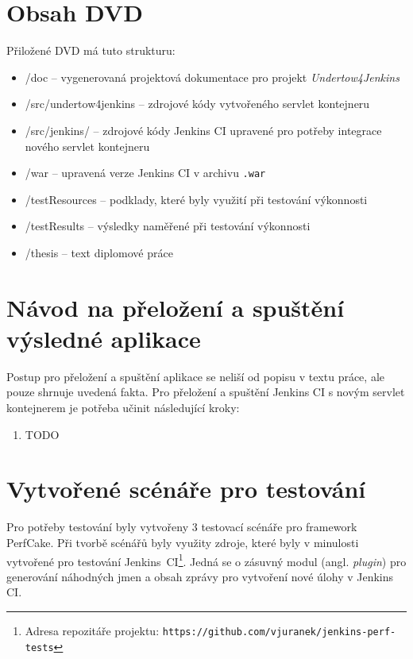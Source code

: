 
\chapter{Obsah DVD}
    Přiložené DVD má tuto strukturu:
    \begin{itemize}
        \item /doc -- vygenerovaná projektová dokumentace pro projekt \emph{Undertow4Jenkins}
        \item /src/undertow4jenkins -- zdrojové kódy vytvořeného servlet kontejneru
        \item /src/jenkins/ -- zdrojové kódy Jenkins CI upravené pro potřeby integrace nového servlet kontejneru
        \item /war -- upravená verze Jenkins CI v archivu \texttt{.war} 
        \item /testResources -- podklady, které byly využití při testování výkonnosti
        \item /testResults -- výsledky naměřené při testování výkonnosti
        \item /thesis -- text diplomové práce
    \end{itemize}


\chapter{Návod na přeložení a spuštění výsledné aplikace}
    Postup pro přeložení a spuštění aplikace se neliší od popisu v textu práce,
    ale pouze shrnuje uvedená fakta.
    Pro přeložení a spuštění Jenkins CI s novým servlet kontejnerem
    je potřeba učinit následující kroky:

    \begin{enumerate}
        \item TODO %
    \end{enumerate}




\chapter{Vytvořené scénáře pro testování} \label{prilohaScenare}
    Pro potřeby testování byly vytvořeny 3 testovací scénáře pro framework PerfCake. 
    Při tvorbě scénářů byly využity zdroje, které byly v minulosti vytvořené pro testování 
    Jenkins~CI\footnote{Adresa repozitáře projektu: 
    \texttt{https://github.com/vjuranek/jenkins-perf-tests}}.
    Jedná se o zásuvný modul (angl. \emph{plugin}) pro 
    generování náhodných jmen a obsah zprávy pro vytvoření nové úlohy v Jenkins CI. 

